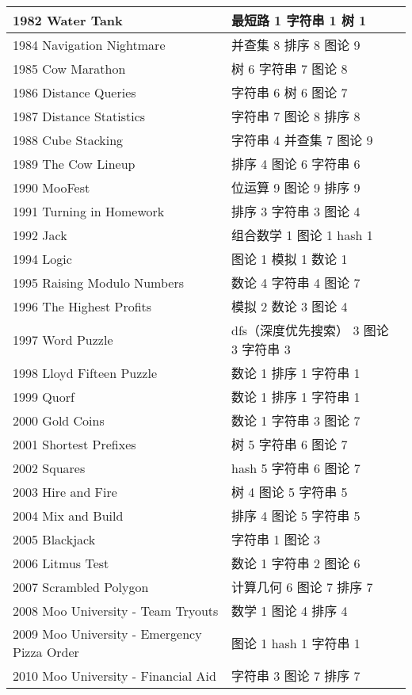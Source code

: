 \begin{longtable}{| p{} | p{} |}
 1982 Water Tank  & 最短路 1 字符串 1 树 1 \\ \hline
 1984 Navigation Nightmare  & 并查集 8 排序 8 图论 9 \\ \hline
 1985 Cow Marathon  & 树 6 字符串 7 图论 8 \\ \hline
 1986 Distance Queries  & 字符串 6 树 6 图论 7 \\ \hline
 1987 Distance Statistics  & 字符串 7 图论 8 排序 8 \\ \hline
 1988 Cube Stacking  & 字符串 4 并查集 7 图论 9 \\ \hline
 1989 The Cow Lineup  & 排序 4 图论 6 字符串 6 \\ \hline
 1990 MooFest  & 位运算 9 图论 9 排序 9 \\ \hline
 1991 Turning in Homework  & 排序 3 字符串 3 图论 4 \\ \hline
 1992 Jack  & 组合数学 1 图论 1 hash 1 \\ \hline
 1994 Logic  & 图论 1 模拟 1 数论 1 \\ \hline
 1995 Raising Modulo Numbers  & 数论 4 字符串 4 图论 7 \\ \hline
 1996 The Highest Profits  & 模拟 2 数论 3 图论 4 \\ \hline
 1997 Word Puzzle  & dfs（深度优先搜索） 3 图论 3 字符串 3 \\ \hline
 1998 Lloyd Fifteen Puzzle  & 数论 1 排序 1 字符串 1 \\ \hline
 1999 Quorf  & 数论 1 排序 1 字符串 1 \\ \hline
 2000 Gold Coins  & 数论 1 字符串 3 图论 7 \\ \hline
 2001 Shortest Prefixes  & 树 5 字符串 6 图论 7 \\ \hline
 2002 Squares  & hash 5 字符串 6 图论 7 \\ \hline
 2003 Hire and Fire  & 树 4 图论 5 字符串 5 \\ \hline
 2004 Mix and Build  & 排序 4 图论 5 字符串 5 \\ \hline
 2005 Blackjack  & 字符串 1 图论 3 \\ \hline
 2006 Litmus Test  & 数论 1 字符串 2 图论 6 \\ \hline
 2007 Scrambled Polygon  & 计算几何 6 图论 7 排序 7 \\ \hline
 2008 Moo University - Team Tryouts  & 数学 1 图论 4 排序 4 \\ \hline
 2009 Moo University - Emergency Pizza Order  & 图论 1 hash 1 字符串 1 \\ \hline
 2010 Moo University - Financial Aid  & 字符串 3 图论 7 排序 7 \\ \hline

\end{longtable}
